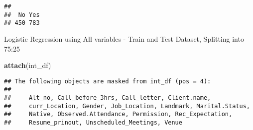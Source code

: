 \documentclass[]{article}
\newenvironment{Shaded}{\begin{snugshade}}{\end{snugshade}}
\newcommand{\KeywordTok}[1]{\textcolor[rgb]{0.13,0.29,0.53}{\textbf{#1}}}
\newcommand{\DataTypeTok}[1]{\textcolor[rgb]{0.13,0.29,0.53}{#1}}
\newcommand{\StringTok}[1]{\textcolor[rgb]{0.31,0.60,0.02}{#1}}
\newcommand{\CommentTok}[1]{\textcolor[rgb]{0.56,0.35,0.01}{\textit{#1}}}
\newcommand{\OperatorTok}[1]{\textcolor[rgb]{0.81,0.36,0.00}{\textbf{#1}}}
\newcommand{\NormalTok}[1]{#1}
\begin{document}
\begin{Shaded}
\end{Shaded}

\begin{verbatim}
## 
##  No Yes 
## 450 783
\end{verbatim}

Logistic Regression using All variables - Train and Test Dataset,
Splitting into 75:25

\begin{Shaded}
\begin{Highlighting}[]
\KeywordTok{attach}\NormalTok{(int_df)}
\end{Highlighting}
\end{Shaded}

\begin{verbatim}
## The following objects are masked from int_df (pos = 4):
## 
##     Alt_no, Call_before_3hrs, Call_letter, Client.name,
##     curr_Location, Gender, Job_Location, Landmark, Marital.Status,
##     Native, Observed.Attendance, Permission, Rec_Expectation,
##     Resume_prinout, Unscheduled_Meetings, Venue
\end{verbatim}
\end{document}
